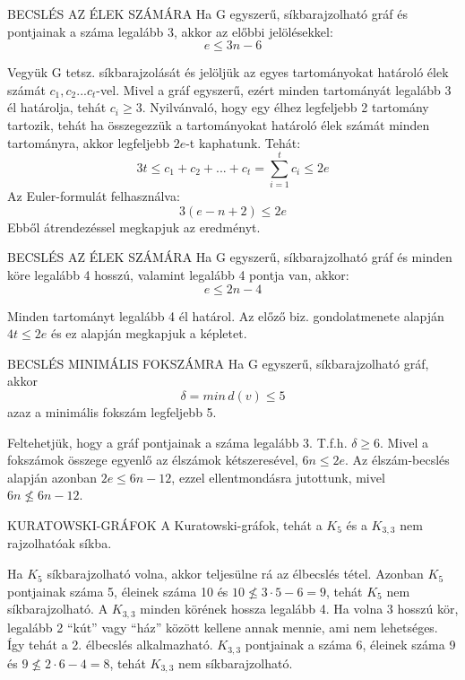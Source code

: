 \begin{tetel}{BECSLÉS AZ ÉLEK SZÁMÁRA}
Ha G egyszerű, síkbarajzolható gráf és pontjainak a száma legalább 3, akkor az előbbi jelölésekkel:
$$e \leq 3n - 6$$
\end{tetel}

\begin{bizonyitas}{}
Vegyük G tetsz. síkbarajzolását és jelöljük az egyes tartományokat határoló élek számát $c_1, c_2...c_t$-vel. Mivel a gráf egyszerű, ezért minden tartományát legalább 3 él határolja, tehát $c_i \geq 3$. Nyilvánvaló, hogy egy élhez legfeljebb 2 tartomány tartozik, tehát ha összegezzük a tartományokat határoló élek számát minden tartományra, akkor legfeljebb $2e$-t kaphatunk. Tehát:
$$3t \leq c_1 + c_2 + ... + c_t = \sum_{i=1}^{t} c_i \leq 2e$$
Az Euler-formulát felhasználva:
$$3(e - n + 2) \leq 2e$$
Ebből átrendezéssel megkapjuk az eredményt.
\end{bizonyitas}

\begin{tetel}{BECSLÉS AZ ÉLEK SZÁMÁRA}
Ha G egyszerű, síkbarajzolható gráf és minden köre legalább 4 hosszú, valamint legalább 4 pontja van, akkor:
$$e \leq 2n - 4$$
\end{tetel}

\begin{bizonyitas}{}
Minden tartományt legalább 4 él határol. Az előző biz. gondolatmenete alapján $4t \leq 2e$ és ez alapján megkapjuk a képletet.
\end{bizonyitas}

\begin{tetel}{BECSLÉS MINIMÁLIS FOKSZÁMRA}
Ha G egyszerű, síkbarajzolható gráf, akkor $$\delta = min\, d(v) \leq 5$$ azaz a minimális fokszám legfeljebb 5.
\end{tetel}

\begin{bizonyitas}{}
Feltehetjük, hogy a gráf pontjainak a száma legalább 3. T.f.h. $\delta \geq 6$. Mivel a fokszámok összege egyenlő az élszámok kétszeresével, $6n \leq 2e$. Az élszám-becslés alapján azonban $2e \leq 6n - 12$, ezzel ellentmondásra jutottunk, mivel $6n \not\leq 6n - 12$.
\end{bizonyitas}

\begin{tetel}{KURATOWSKI-GRÁFOK}
A Kuratowski-gráfok, tehát a $K_5$ és a $K_{3,3}$ nem rajzolhatóak síkba.
\end{tetel}

\begin{bizonyitas}{}
Ha $K_5$ síkbarajzolható volna, akkor teljesülne rá az élbecslés tétel. Azonban $K_5$ pontjainak száma 5, éleinek száma 10 és $10 \not\leq 3 \cdot 5 -6 = 9$, tehát $K_5$ nem síkbarajzolható.
A $K_{3,3}$ minden körének hossza legalább 4. Ha volna 3 hosszú kör, legalább 2 ``kút'' vagy ``ház'' között kellene annak mennie, ami nem lehetséges. Így tehát a 2. élbecslés alkalmazható. $K_{3,3}$ pontjainak a száma 6, éleinek száma 9 és $9 \not\leq 2 \cdot 6 - 4 = 8$, tehát $K_{3,3}$ nem síkbarajzolható.
\end{bizonyitas}

